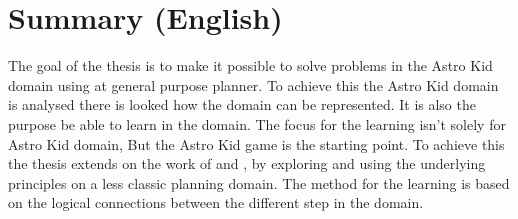 \chapter{Summary (English)}

The goal of the thesis is to make it possible to solve problems in the Astro Kid domain using at general purpose planner. To achieve this the Astro Kid domain is analysed there is looked how the domain can be represented. It is also the purpose be able to learn in the domain. The focus for the learning isn't solely for Astro Kid domain, But the Astro Kid game is the starting point. To achieve this the thesis extends on the work of \cite{Action-Schemas} and \cite{jacobsen2015a}, by exploring and using the underlying principles on a less classic planning domain. The method for the learning is based on the logical connections between the different step in the domain.